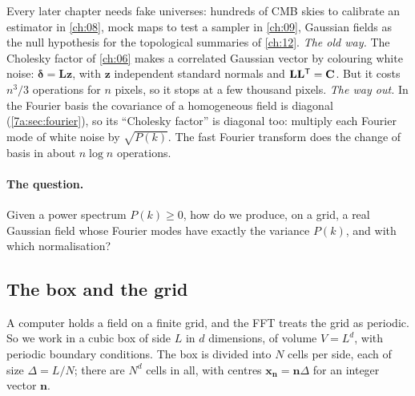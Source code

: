 Every later chapter needs fake universes: hundreds of CMB skies to calibrate an
estimator in \cref{ch:08}, mock maps to test a sampler in \cref{ch:09}, Gaussian
fields as the null hypothesis for the topological summaries of \cref{ch:12}.
\emph{The old way.} The Cholesky factor of \cref{ch:06} makes a correlated
Gaussian vector by colouring white noise: $\bm\delta=\mathbf L\bm z$, with
$\bm z$ independent standard normals and $\mathbf L\mathbf L^{\mathsf{T}}=\mathbf{C}$. But it
costs $n^3/3$ operations for $n$ pixels, so it stops at a few thousand pixels.
\emph{The way out.} In the Fourier basis the covariance of a homogeneous field is
diagonal (\cref{7a:sec:fourier}), so its ``Cholesky factor'' is diagonal too:
multiply each Fourier mode of white noise by $\sqrt{P(k)}$. The fast Fourier
transform does the change of basis in about $n\log n$ operations.

\paragraph{The question.} Given a power spectrum $P(k)\ge0$, how do we produce,
on a grid, a real Gaussian field whose Fourier modes have exactly the variance
$P(k)$, and with which normalisation?

\subsection{The box and the grid}
\label{7a:sec:box}

A computer holds a field on a finite grid, and the FFT treats the grid as
periodic. So we work in a cubic box of side $L$ in $d$ dimensions, of volume
$V=L^d$, with periodic boundary conditions. The box is divided into $N$ cells per
side, each of size $\Delta=L/N$; there are $N^d$ cells in all, with centres
$\bm x_{\bm n}=\bm n\Delta$ for an integer vector $\bm n$.

